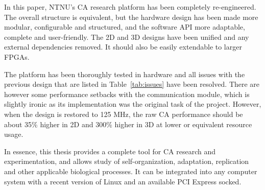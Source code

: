 In this paper, NTNU's CA research platform has been completely re-engineered.
The overall structure is equivalent, but the hardware design has been made more modular, configurable and structured, and the software API more adaptable, complete and user-friendly.
The 2D and 3D designs have been unified and any external dependencies removed.
It should also be easily extendable to larger FPGAs.

The platform has been thoroughly tested in hardware and all issues with the previous design that are listed in Table~\ref{tab:issues} have been resolved.
There are however some performance setbacks with the communication module, which is slightly ironic as its implementation was the original task of the project.
However, when the design is restored to 125 MHz, the raw CA performance should be about 35\% higher in 2D and 300\% higher in 3D at lower or equivalent resource usage.

In essence, this thesis provides a complete tool for CA research and experimentation, and allows study of self-organization, adaptation, replication and other applicable biological processes.
It can be integrated into any computer system with a recent version of Linux and an available PCI Express socked.
